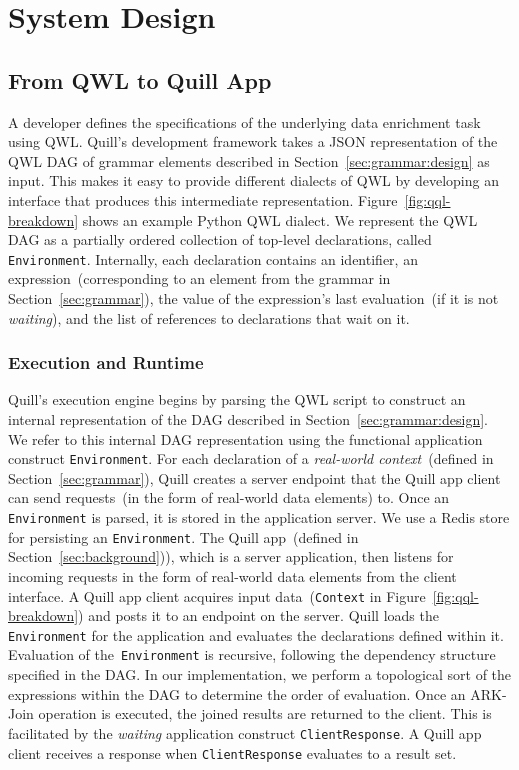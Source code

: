 \documentclass[11pt]{article}
\begin{document}
\section{System Design}\label{sec:implementation}

\subsection{From QWL to Quill App}
\label{sec:implementation:qql}

A developer defines the specifications of the underlying data enrichment task using QWL. Quill's development framework takes a JSON representation of the QWL DAG of grammar elements described in Section~\ref{sec:grammar:design} as input. This makes it easy to provide different dialects of QWL by developing an interface that produces this intermediate representation.
Figure~\ref{fig:qql-breakdown} shows an example Python QWL dialect. We represent the QWL DAG as a partially ordered collection of top-level declarations, called \texttt{Environment}. Internally, each declaration contains an identifier, an expression~(corresponding to an element from the grammar in Section~\ref{sec:grammar}), the value of the expression's last evaluation~(if it is not \textit{waiting}), and the list of references to declarations that wait on it.
\vspace{0.05cm}

\subsubsection{Execution and Runtime}
Quill's execution engine begins by parsing the QWL script to construct an internal representation of the DAG described in Section~\ref{sec:grammar:design}. We refer to this internal DAG representation using the functional application construct \texttt{Environment}.
For each declaration of a \emph{real-world context}~(defined in Section~\ref{sec:grammar}), Quill creates a server endpoint that the Quill app client can send requests~(in the form of real-world data elements) to. Once an \texttt{Environment} is parsed, it is stored in the application server. We use a Redis store for persisting an \texttt{Environment}. The Quill app~(defined in Section~\ref{sec:background})), which is a server application, then listens for incoming requests in the form of real-world data elements from the client interface. A Quill app client acquires input data~(\texttt{Context} in Figure~\ref{fig:qql-breakdown}) and posts it to an endpoint on the server. Quill loads the \texttt{Environment} for the application and evaluates the declarations defined within it. Evaluation of the~\texttt{Environment} is recursive, following the dependency structure specified in the DAG. In our implementation, we perform a topological sort of the expressions within the DAG to determine the order of evaluation. Once an ARK-Join operation is executed, the joined results are returned to the client. This is facilitated by the \textit{waiting} application construct \texttt{ClientResponse}. A Quill app client receives a response when \texttt{ClientResponse} evaluates to a result set.\vspace{0.05cm}
\end{document}
